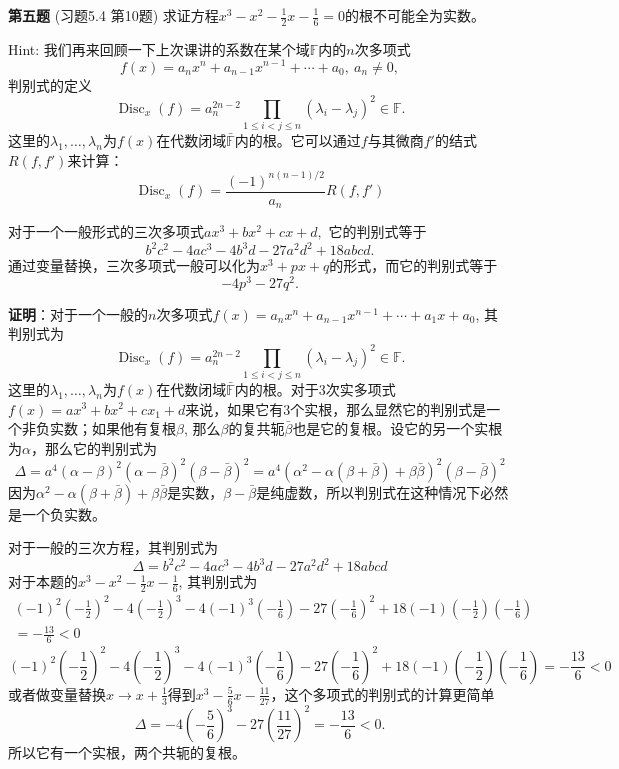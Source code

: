 \fi  %

\newpageorvspace

{\bf 第五题} (习题5.4 第10题) 求证方程$x^3 - x^2 - \frac{1}{2}x - \frac{1}{6} = 0$的根不可能全为实数。

\vspace{0.5em}

Hint: 我们再来回顾一下上次课讲的系数在某个域$\mathbb{F}$内的$n$次多项式
$$
f(x) = a_{n}x^{n} + a_{n-1}x^{n-1} + \cdots + a_{0}, ~ a_n \neq 0,
$$
判别式的定义
$$\operatorname{Disc}_x(f) = a_n^{2n-2} \prod_{1 \leqslant i < j \leqslant n} (\lambda_i - \lambda_j)^2 \in \mathbb{F}.$$
这里的$\lambda_1, \ldots, \lambda_n$为$f(x)$在代数闭域$\bar{\mathbb{F}}$内的根。它可以通过$f$与其微商$f'$的结式$R(f,f')$来计算：
$$\operatorname{Disc}_x(f) = \frac{(-1)^{n(n-1)/2}}{a_n} R(f,f')$$

对于一个一般形式的三次多项式$ax^3 + bx^2 + cx + d,$ 它的判别式等于
$$b^{2}c^{2}-4ac^{3}-4b^{3}d-27a^{2}d^{2}+18abcd.$$
通过变量替换，三次多项式一般可以化为$x^3 + px + q$的形式，而它的判别式等于
$$-4p^3 - 27q^2.$$

\ifIncludeAnswer

\newpageorvspace

{\bf 证明}：对于一个一般的$n$次多项式$f(x) = a_{n}x^{n}+a_{n-1}x^{n-1}+\cdots +a_{1}x+a_{0}$, 其判别式为
$$\operatorname{Disc}_x(f) = a_n^{2n-2} \prod_{1 \leqslant i < j \leqslant n} (\lambda_i - \lambda_j)^2 \in \mathbb{F}.$$
这里的$\lambda_1, \ldots, \lambda_n$为$f(x)$在代数闭域$\bar{\mathbb{F}}$内的根。对于3次实多项式$f(x) = ax^3+bx^2+cx_1+d$来说，如果它有3个实根，那么显然它的判别式是一个非负实数；如果他有复根$\beta$, 那么$\beta$的复共轭$\bar{\beta}$也是它的复根。设它的另一个实根为$\alpha$，那么它的判别式为
$$\Delta = a^4 (\alpha-\beta)^2(\alpha-\bar{\beta})^2(\beta-\bar{\beta})^2 = a^4 (\alpha^2-\alpha(\beta+\bar{\beta})+\beta\bar{\beta})^2 (\beta-\bar{\beta})^2$$
因为$\alpha^2-\alpha(\beta+\bar{\beta})+\beta\bar{\beta}$是实数，$\beta-\bar{\beta}$是纯虚数，所以判别式在这种情况下必然是一个负实数。

对于一般的三次方程，其判别式为
$$\Delta = b^{2}c^{2}-4ac^{3}-4b^{3}d-27a^{2}d^{2}+18abcd$$
对于本题的$x^3 - x^2 - \frac{1}{2}x - \frac{1}{6}$, 其判别式为
\ifLargeLayout
\begin{multline*}
(-1)^2(-\frac{1}{2})^2 - 4(-\frac{1}{2})^3 - 4(-1)^3(-\frac{1}{6}) - 27(-\frac{1}{6})^2 + 18(-1)(-\frac{1}{2})(-\frac{1}{6}) \\
= -\frac{13}{6} < 0
\end{multline*}
\else
$$(-1)^2(-\frac{1}{2})^2 - 4(-\frac{1}{2})^3 - 4(-1)^3(-\frac{1}{6}) - 27(-\frac{1}{6})^2 + 18(-1)(-\frac{1}{2})(-\frac{1}{6}) = -\frac{13}{6} < 0$$
\fi  %
或者做变量替换$x\to x+\frac{1}{3}$得到$x^{3} - \frac{5}{6}x - \frac{11}{27}$，这个多项式的判别式的计算更简单
$$\Delta = -4(-\frac{5}{6})^3 - 27 (\frac{11}{27})^2 = -\frac{13}{6} < 0.$$
所以它有一个实根，两个共轭的复根。

\fi  %








